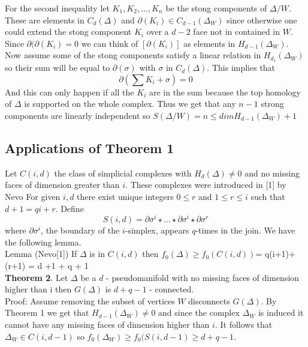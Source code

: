 \documentclass[a4paper]{article}
\begin{document}
{For the second inequality let $K_1,K_2,...,K_n$ be the stong components of $\Delta/W$. These are elements in $C_d(\Delta)$ and $\partial(K_i) \in C_{d-1}(\Delta_W)$ since otherwise one could extend the stong component $K_i$ over a $d-2$ face not in contained in $W$. Since $\partial(\partial(K_i)=0$ we can think of $[\partial(K_i)]$ as elements in $H_{d-1}(\Delta_W)$. Now assume some of the stong components satisfy a linear relation in $H_{d_1}(\Delta_W)$ so their sum will be equal to $\partial(\sigma)$ with $\sigma$ in $C_d(\Delta)$. This implies that 
  $$\partial(\sum K_i+\sigma) =0$$ And this can only happen if all the $K_i$ are in the sum because the top homology of $\Delta$ is supported on the whole complex. Thus we get that any $n-1$ strong components are linearly independent so $S(\Delta/W)= n\leq dim H_{d-1}(\Delta_W)+1  $



\subsection{Applications of Theorem 1}


Let $C(i,d)$ the class of simplicial complexes with $H_d(\Delta)\neq 0$ and 
no missing faces of dimension greater than $i$. These complexes were introduced in [1] by Nevo For given $i,d$  there exist unique integers $0 \leq r$ and $1 \leq r\leq i$ such that $d+1 = qi+r$. Define $$S(i,d) = \partial \sigma^i\star...\star \partial \sigma^i \star \partial \sigma^r $$ where $\partial \sigma^i$, the boundary of the $i$-simplex, appears $q$-times in the join. We have the following lemma.   \\

Lemma (Nevo[1]) If $\Delta$ is in $C(i,d)$ then $f_0(\Delta)\geq f_0(C(i,d))$= q(i+1)+(r+1) = d +1 + q + 1 \\

\textbf{Theorem 2}. Let $\Delta$ be a $d$ - pseudomanifold with no missing faces of dimension higher than i then $G(\Delta)$ is $d+q-1$ - connected. \\ 

Proof: Assume removing the subset of vertices $W$ disconnects $G(\Delta)$. By Theorem 1 we get that $H_{d-1}(\Delta_W)\neq 0$ and since the complex $\Delta_W$ is induced it cannot have any missing faces of dimension higher than $i$. It follows that $\Delta_W \in C(i, d-1)$ so $f_0(\Delta_W) \geq f_0(S(i,d-1) \geq d+q-1 $. \\ \\ 


}
\end{document}
